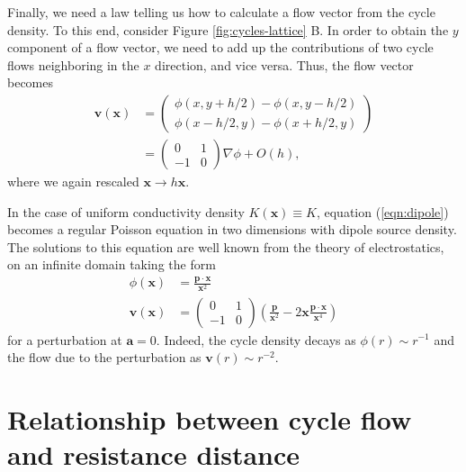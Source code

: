\documentclass[10pt,aps,pra,twocolumn,superscriptaddress]{revtex4-1}
\renewcommand{\vec}[1]{\boldsymbol{#1}}
\begin{document}
Finally, we need a law telling us how to calculate a flow vector
from the cycle density. To this end, consider 
Figure \ref{fig:cycles-lattice} B. In order to obtain the $y$ component
of a flow vector, we need to add up the contributions of two cycle
flows neighboring in the $x$ direction, and vice versa. Thus,
the flow vector becomes
\begin{align}
    \vec v(\vec x) &= \begin{pmatrix}
        \phi(x,y+h/2) - \phi(x, y-h/2) \\
        \phi(x-h/2,y) - \phi(x+h/2,y)
    \end{pmatrix} \\
    &= \begin{pmatrix}
        0 & 1 \\
        -1 & 0
    \end{pmatrix} \nabla \phi + O(h),
\end{align}
where we again rescaled $\vec x\rightarrow h \vec x$.

In the case of uniform conductivity density $K(\vec x) \equiv K$,
equation (\ref{eqn:dipole}) becomes a regular Poisson equation
in two dimensions with dipole source density. The solutions
to this equation are well known from the theory of electrostatics, 
on an infinite domain taking the form
\begin{align}
    \phi(\vec x) &= \frac{\vec p \cdot \vec x}{\vec x^2} \\
    \vec v(\vec x) &= \begin{pmatrix} 0 & 1 \\ -1 & 0 \end{pmatrix}
        \left( \frac{\vec p}{\vec x^2} - 2 \vec x \frac{\vec p \cdot
             \vec x}{\vec x^4} \right)
\end{align}
for a perturbation at $\vec a = 0$.
Indeed, the cycle density decays as $\phi(r) \sim r^{-1}$ and 
the flow due to the perturbation as $\vec v(r) \sim r^{-2}$.






\section{Relationship between cycle flow and resistance distance}
\label{sec:resdist}
\end{document}
